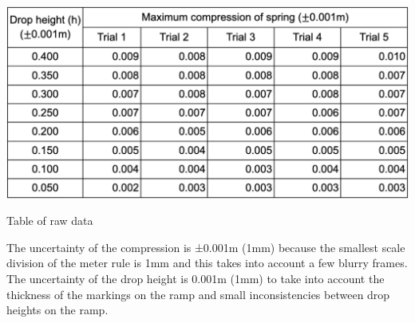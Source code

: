 \begin{table}[!htb]
    \includegraphics[width = \textwidth]{rawtbl.png}
    \caption{Table of raw data}
\end{table}
\FloatBarrier
The uncertainty of the compression is ±0.001m (1mm) because the smallest scale division of the meter rule is 1mm and this takes into account a few blurry frames. The uncertainty of the drop height is 0.001m (1mm) to take into account the thickness of the markings on the ramp and small inconsistencies between drop heights on the ramp.